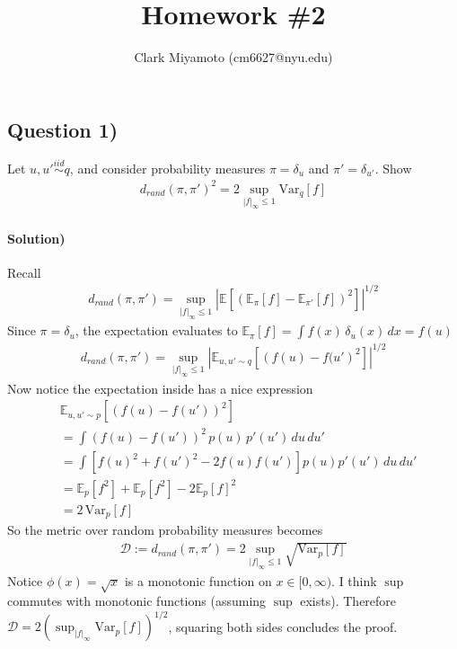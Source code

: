 \documentclass[11pt,fleqn]{article}
\title{Homework \#2}
\author{Clark Miyamoto (cm6627@nyu.edu)}
\date{}
\numberwithin{equation}{section}
\theoremstyle{definition}
\theoremstyle{definition}
\begin{document}
\maketitle

\subsection*{Question 1)} Let $u,u' \overset{iid}{\sim} q$, and consider probability measures $\pi = \delta_u$ and $\pi' = \delta_{u'}$. Show 
\begin{align}
	d_{rand}(\pi, \pi')^2 = 2 \sup_{|f|_{\infty} \leq 1} \text{Var}_q[f]
\end{align}

\paragraph{Solution)} Recall
\begin{align}
	d_{rand}(\pi, \pi') = \sup_{|f|_{\infty} \leq 1} \left |  \mathbb E \left[\left( \mathbb E_\pi[f] - \mathbb E_{\pi'}[f] \right)^2 \right]\right  |^{1/2}
\end{align}
Since $\pi = \delta_u$, the expectation evaluates to $\mathbb E_\pi[f] = \int f(x) \, \delta_u(x) \, dx = f(u)$
\begin{align}
	d_{rand}(\pi, \pi')= \sup_{|f|_{\infty} \leq 1} \left | \mathbb E_{u,u' \sim q} \left[\left( f(u) - f(u' \right)^2 \right]\right|^{1/2}
\end{align}
Now notice the expectation inside has a nice  expression
\begin{align}
& \mathbb E_{u,u' \sim p}[(f(u) - f(u'))^2]\\
& = \int (f(u) - f(u'))^2 \, p(u) \, p'(u') \, du \, du'\\
& = \int [f(u)^2 + f(u')^2 - 2 f(u) f(u')] p(u) p'(u') \, du \, du'\\
& = \mathbb E_p[f^2] + \mathbb E_p[f^2] - 2 \mathbb E_p[f]^2\\
& = 2 \, \text{Var}_p[f]
\end{align}
So the metric over random probability measures becomes
\begin{align}
	\mathcal D := d_{rand}(\pi, \pi') = 2 \sup_{|f|_{\infty} \leq 1}  \sqrt{ \text{Var}_p[f] }
\end{align}
Notice $\phi(x) = \sqrt{x}$ is a monotonic function on $x \in [0, \infty)$. I think $\sup$ commutes with monotonic functions (assuming $\sup$ exists). Therefore $\mathcal D = 2 \left( \sup_{|f|_{\infty }} \text{Var}_p[f] \right)^{1/2}$, squaring both sides concludes the proof.
\end{document}
